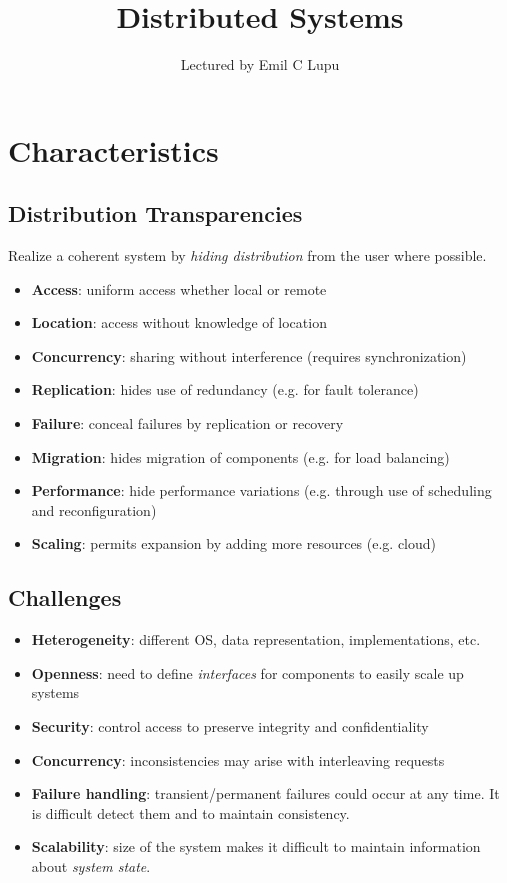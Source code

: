 \documentclass[twocolumn,landscape,10pt]{article}
\author{Lectured by Emil C Lupu}
\title{Distributed Systems}
\affil{Typed by Aris Zhu Yi Qing}
\theoremstyle{definition}
\begin{document}
\maketitle
\tableofcontents
\newpage

\section{Characteristics}

\subsection{Distribution Transparencies}

Realize a coherent system by \emph{hiding distribution} from the user where
possible.

\begin{itemize}
    \item \textbf{Access}: uniform access whether local or remote
    \item \textbf{Location}: access without knowledge of location
    \item \textbf{Concurrency}: sharing without interference (requires synchronization)
    \item \textbf{Replication}: hides use of redundancy (e.g. for fault tolerance)
    \item \textbf{Failure}: conceal failures by replication or recovery
    \item \textbf{Migration}: hides migration of components (e.g. for load balancing)
    \item \textbf{Performance}: hide performance variations (e.g. through use of
        scheduling and reconfiguration)
    \item \textbf{Scaling}: permits expansion by adding more resources (e.g. cloud)
\end{itemize} 

\subsection{Challenges}

\begin{itemize}
    \item \textbf{Heterogeneity}: different OS, data
        representation, implementations, etc.
    \item \textbf{Openness}: need to define \emph{interfaces} for components to
        easily scale up systems
    \item \textbf{Security}: control access to preserve integrity and
        confidentiality
    \item \textbf{Concurrency}: inconsistencies may arise with interleaving
        requests
    \item \textbf{Failure handling}: transient/permanent failures could occur at
        any time. It is difficult detect them and to maintain consistency.
    \item \textbf{Scalability}: size of the system makes it difficult to
        maintain information about \emph{system state}.
\end{itemize} 
\end{document}
